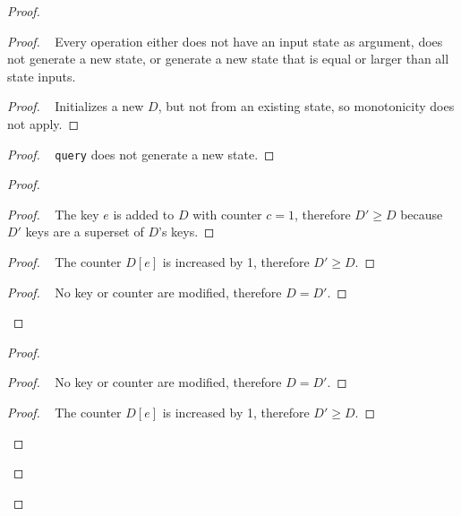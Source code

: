 \documentclass[10pt, oneside]{article}   	%
\begin{document}
\begin{proof}
	\begin{proof}
		\pfsketch~ Every operation either does not have an input state as argument, does not generate a new state, or generate a new state that is equal or larger than all state inputs.
		\begin{proof}
			\pf~ Initializes a new $D$, but not from an existing state, so monotonicity does not apply.
		\end{proof}
		
		\begin{proof}
			\pf~ \texttt{query} does not generate a new state.
		\end{proof}
		
		\begin{proof}
			\begin{proof}
				\pf~ The key $e$ is added to $D$ with counter $c=1$, therefore $D' \geq D$ because $D'$ keys are a superset of $D$'s keys.
			\end{proof}
			
			\begin{proof}
				\pf~ The counter $D[e]$ is increased by 1, therefore $D' \geq D$.
			\end{proof}
			
			\begin{proof}
				\pf~ No key or counter are modified, therefore $D=D'$.
			\end{proof}
		\end{proof}
		
		\begin{proof}
			\begin{proof}
				\pf~ No key or counter are modified, therefore $D=D'$.
			\end{proof}
			
			\begin{proof}
				\pf~ The counter $D[e]$ is increased by 1, therefore $D' \geq D$.
			\end{proof}
			

\end{proof}
\end{proof}
\end{proof}
\end{document}
